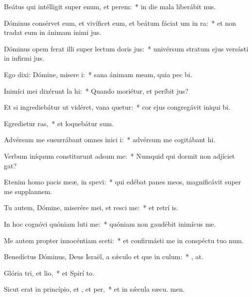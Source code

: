 \item Beátus qui intélligit super enum, et perem:~* in die mala liberábit  nus.
\item Dóminus consérvet eum, et vivíficet eum, et beátum fáciat um in ra:~* et non tradat eum in ánimam inimi jus.
\item Dóminus opem ferat illi super lectum doris jus:~* univérsum stratum ejus versásti in infirmi jus.
\item Ego dixi: Dómine, misere i:~* sana ánimam meam, quia pec bi.
\item Inimíci mei dixérunt la hi:~* Quando moriétur, et períbit  jus?
\item Et si ingrediebátur ut vidéret, vana quetur:~* cor ejus congregávit iniqui bi.
\item Egredietur ras,~* et loquebátur  sum.
\item Advérsum me susurrábant omnes inici i:~* advérsum me cogitábant  hi.
\item Verbum iníquum constiturunt adsum me:~* Numquid qui dormit non adjíciet  gat?
\item Etenim homo pacis meæ, in  spevi:~* qui edébat panes meos, magnificávit super me supplannem.
\item Tu autem, Dómine, miserére mei, et resci me:~* et retrí is.
\item In hoc cognóvi quóniam luti me:~* quóniam non gaudébit inimícus   me.
\item Me autem propter innocéntiam sceti:~* et confirmásti me in conspéctu tuo  num.
\item Benedíctus Dóminus, Deus Israël, a sǽculo et que in culum:~* , at.
\item Glória tri, et lio,~* et Spirí to.
\item Sicut erat in princípio, et , et per,~* et in sǽcula sæcu. men.
